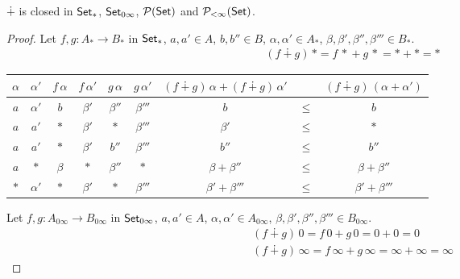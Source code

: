\documentclass[runningheads,envcountsame]{llncs}
\begin{document}
\begin{lemma}
    $\dotplus$ is closed in $\mathsf{Set}_*$, $\mathsf{Set}_{0\infty}$, $\mathcal{P}(\mathsf{Set})$ and $\mathcal{P}_{<\infty}(\mathsf{Set})$.
\end{lemma}
\begin{proof}
    Let $f, g\colon A_* \to B_*$ in $\mathsf{Set}_*$, $a, a' \in A$, $b, b'' \in B$, $\alpha, \alpha' \in A_*$, $\beta, \beta', \beta'', \beta''' \in B_*$. 
    \begin{gather}
        (f \dotplus g)\,{*} = {f\,*} + {g\,*} = * + * = *
    \end{gather}
    \begin{center}
    \begin{tabular}{|c|c|c|c|c|c||c|c|c|}
        $\alpha$ & $\alpha'$ & $f\,\alpha$ & $f\,\alpha'$ & $g\,\alpha$ & $g\,\alpha'$ & $(f \dotplus g)\,\alpha + (f \dotplus g)\,\alpha' $ & & $(f \dotplus g)\,(\alpha + \alpha')$ \\
        \hline
        $a$ & $\alpha'$ & $b$ & $\beta'$ & $\beta''$ & $\beta'''$ & $b$ & $\leq$ & $b$ \\
        $a$ & $a'$ & $*$ & $\beta'$ & $*$ & $\beta'''$ & $\beta'$ & $\leq$ & $*$ \\
        $a$ & $a'$ & $*$ & $\beta'$ & $b''$ & $\beta'''$ & $b''$ & $\leq$ & $b''$ \\
        $a$ & $*$ & $\beta$ & $*$ & $\beta''$ & $*$ & $\beta + \beta''$ & $\leq$ & $\beta + \beta''$ \\
        $*$ & $\alpha'$ & $*$ & $\beta'$ & $*$ & $\beta'''$ & $\beta' + \beta'''$ & $\leq$ & $\beta' + \beta'''$ \\
    \end{tabular}
    \end{center}
    
    Let $f, g\colon A_{0\infty} \to B_{0\infty}$ in $\mathsf{Set}_{0\infty}$, $a, a' \in A$, $\alpha, \alpha' \in A_{0\infty}$, $\beta, \beta', \beta'', \beta''' \in B_{0\infty}$. 
    \begin{gather}
        (f \dotplus g)\,{0} = {f\,0} + {g\,0} = 0 + 0 = 0 \\
        (f \dotplus g)\,{\infty} = {f\,\infty} + {g\,\infty} = \infty + \infty = \infty
    \end{gather}
\end{proof}
\end{document}
